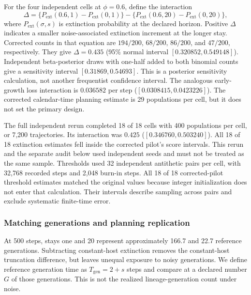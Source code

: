 For the four independent cells at $\phi=0.6$, define the interaction
\begin{equation}
 \Delta=\{P_{\mathrm{ext}}(0.6,1)-P_{\mathrm{ext}}(0,1)\}
       -\{P_{\mathrm{ext}}(0.6,20)-P_{\mathrm{ext}}(0,20)\},
 \label{num-interaction}
\end{equation}
where $P_{\mathrm{ext}}(\sigma,s)$ is extinction probability at the declared
horizon. Positive $\Delta$ indicates a smaller noise-associated extinction
increment at the longer stay. Corrected counts in that equation are
$194/200$, $68/200$, $86/200$, and $47/200$, respectively. They give
$\Delta=0.435$ (95\% normal interval $[0.320852,0.549148]$).
Independent beta-posterior draws with one-half added to both binomial
counts give a sensitivity interval $[0.31869,0.54693]$. This is a posterior
sensitivity calculation, not another frequentist confidence interval.
The analogous early-growth loss interaction is $0.036582$ per step
($[0.0308415,0.0423226]$). The corrected calendar-time planning estimate
is 29 populations per cell, but it does not set the primary design.

The full independent rerun completed 18 of 18 cells with 400 populations
per cell, or 7,200 trajectories. Its interaction was $0.425$
($[0.346760,0.503240]$). All 18 of 18 extinction estimates fell inside
the corrected pilot's score intervals. This rerun and the separate audit
below used independent seeds and must not be treated as the same sample.
Thresholds used 32 independent antithetic pairs per cell, with 32,768
recorded steps and 2,048 burn-in steps. All 18 of 18 corrected-pilot
threshold estimates matched the original values because integer
initialization does not enter that calculation. Their intervals describe
sampling across pairs and exclude systematic finite-time error.

\subsubsection{Matching generations and planning replication}
\label{num-esm-matched}

At 500 steps, stays one and 20 represent approximately 166.7 and 22.7
reference generations. Subtracting constant-host extinction removes the
constant-host truncation difference, but leaves unequal exposure to noisy
generations. We define reference generation time as $T_{\mathrm{gen}}=2+s$
steps and compare at a declared number $G$ of those generations.
This is not the realized lineage-generation count under noise.

